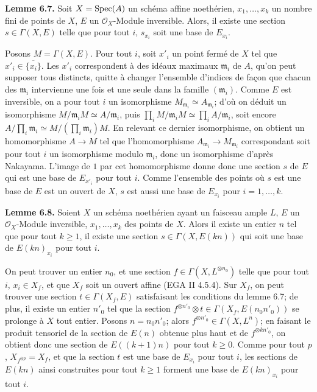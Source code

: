 \textbf{Lemme 6.7.} Soit $X=\operatorname{Spec}(A)$ un schéma affine noethérien, $x_1,\ldots,x_k$ un nombre fini de points de $X$, $E$ un $\mathcal O_X$-Module inversible. Alors, il existe une section $s\in\Gamma(X,E)$ telle que pour tout $i$, $s_{x_i}$ soit une base de $E_{x_i}$.

Posons $M=\Gamma(X,E)$. Pour tout $i$, soit $x'_i$ un point fermé de $X$ tel que $x'_i\in\overline{\{x_i\}}$. Les $x'_i$ correspondent à des idéaux maximaux $\mathfrak m_i$ de $A$, qu'on peut supposer tous distincts, quitte à changer l'ensemble d'indices de façon que chacun des $\mathfrak m_i$ intervienne une fois et une seule dans la famille $(\mathfrak m_i)$. Comme $E$ est inversible, on a pour tout $i$ un isomorphisme $M_{\mathfrak m_i}\simeq A_{\mathfrak m_i}$; d'où on déduit un isomorphisme $M/\mathfrak m_iM\simeq A/\mathfrak m_i$, puis $\prod_i M/\mathfrak m_iM\simeq\prod_i A/\mathfrak m_i$, soit encore $A/\prod_i\mathfrak m_i\simeq M/(\prod_i\mathfrak m_i)M$. En relevant ce dernier isomorphisme, on obtient un homomorphisme $A\to M$ tel que l'homomorphisme $A_{\mathfrak m_i}\to M_{\mathfrak m_i}$ correspondant soit pour tout $i$ un isomorphisme modulo $\mathfrak m_i$, donc un isomorphisme d'après Nakayama. L'image de $1$ par cet homomorphisme donne donc une section $s$ de $E$ qui est une base de $E_{x'_i}$ pour tout $i$. Comme l'ensemble des points où $s$ est une base de $E$ est un ouvert de $X$, $s$ est aussi une base de $E_{x_i}$ pour $i=1,\ldots,k$.

\textbf{Lemme 6.8.} Soient $X$ un schéma noethérien ayant un faisceau ample $L$, $E$ un $\mathcal O_X$-Module inversible, $x_1,\ldots,x_k$ des points de $X$. Alors il existe un
entier $n$ tel que pour tout $k\ge1$, il existe une section $s\in\Gamma(X,E(kn))$ qui soit une base de $E(kn)_{x_i}$ pour tout $i$.

On peut trouver un entier $n_0$, et une section $f\in\Gamma(X,L^{\otimes n_0})$ telle que pour tout $i$, $x_i\in X_f$, et que $X_f$ soit un ouvert affine (EGA II 4.5.4). Sur $X_f$, on peut trouver une section $t\in\Gamma(X_f,E)$ satisfaisant les conditions du lemme 6.7; de plus, il existe un entier $n'_0$ tel que la section $f^{\otimes n'_0}\otimes t\in\Gamma(X_f,E(n_0n'_0))$ se prolonge à $X$ tout entier. Posons $n=n_0n'_0$; alors $f^{\otimes n'_0}\in\Gamma(X,L^n)$; en faisant le produit tensoriel de la section de $E(n)$ obtenue plus haut et de $f^{\otimes kn'_0}$, on obtient donc une section de $E((k+1)n)$ pour tout $k\ge0$. Comme pour tout $p$, $X_{f^{\otimes p}}=X_f$, et que la section $t$ est une base de $E_{x_i}$ pour tout $i$, les sections de $E(kn)$ ainsi construites pour tout $k\ge1$ forment une base de $E(kn)_{x_i}$ pour tout $i$.

